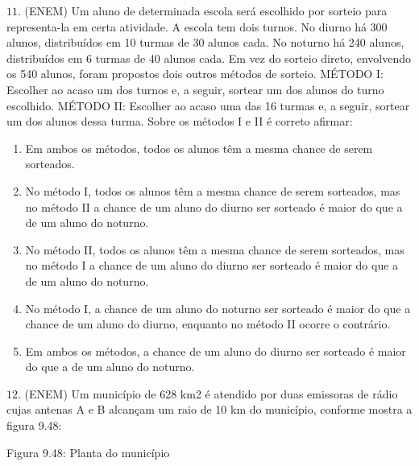 \(11.\) (ENEM) Um aluno de determinada escola será escolhido por sorteio para representa-la em certa atividade. A escola tem dois turnos. No diurno há 300 alunos, distribuídos em 10 turmas de 30 alunos cada. No noturno há 240 alunos, distribuídos em 6 turmas de 40 alunos cada. Em vez do sorteio direto, envolvendo os 540 alunos, foram propostos dois outros métodos de sorteio.
MÉTODO I: Escolher ao acaso um dos turnos e, a seguir, sortear um dos alunos do turno escolhido.
MÉTODO II: Escolher ao acaso uma das 16 turmas e, a seguir, sortear um dos alunos dessa turma.
Sobre os métodos I e II é correto afirmar:
\begin{enumerate}
\item {} 
Em ambos os métodos, todos os alunos têm a mesma chance de serem sorteados.

\item {} 
No método I, todos os alunos têm a mesma chance de serem sorteados, mas no método II a chance de um aluno do diurno ser sorteado é maior do que a de um aluno do noturno.

\item {} 
No método II, todos os alunos têm a mesma chance de serem sorteados, mas no método I a chance de um aluno do diurno ser sorteado é maior do que a de um aluno do noturno.

\item {} 
No método I, a chance de um aluno do noturno ser sorteado é maior do que a chance de um aluno do diurno, enquanto no método II ocorre o contrário.

\item {} 
Em ambos os métodos, a chance de um aluno do diurno ser sorteado é maior do que a de um aluno do noturno.

\end{enumerate}

\(12.\) (ENEM) Um município de 628 km2 é atendido por duas emissoras de rádio cujas antenas A e B alcançam um raio de 10 km do município, conforme mostra a figura 9.48:
\begin{center}\end{center}
Figura 9.48: Planta do município

